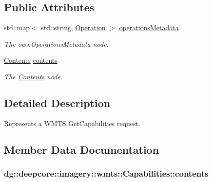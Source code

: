 \subsection*{Public Attributes}
\begin{DoxyCompactItemize}
\item 
std\+::map$<$ std\+::string, \hyperlink{structdg_1_1deepcore_1_1imagery_1_1wmts_1_1_operation}{Operation} $>$ \hyperlink{structdg_1_1deepcore_1_1imagery_1_1wmts_1_1_capabilities_a8f1483625c85a9ecebec0093ddfc6103}{operations\+Metadata}
\begin{DoxyCompactList}\small\item\em The ows\+:Operations\+Metadata node. \end{DoxyCompactList}\item 
\hyperlink{structdg_1_1deepcore_1_1imagery_1_1wmts_1_1_contents}{Contents} \hyperlink{structdg_1_1deepcore_1_1imagery_1_1wmts_1_1_capabilities_a0f74f0847b9299ec63d808edb74b1296}{contents}
\begin{DoxyCompactList}\small\item\em The \hyperlink{structdg_1_1deepcore_1_1imagery_1_1wmts_1_1_contents}{Contents} node. \end{DoxyCompactList}\end{DoxyCompactItemize}


\subsection{Detailed Description}
Represents a W\+M\+TS Get\+Capabilities request. 

\subsection{Member Data Documentation}
\subsubsection[{\texorpdfstring{contents}{contents}}]{ dg\+::deepcore\+::imagery\+::wmts\+::\+Capabilities\+::contents}\hypertarget{structdg_1_1deepcore_1_1imagery_1_1wmts_1_1_capabilities_a0f74f0847b9299ec63d808edb74b1296}{}\label{structdg_1_1deepcore_1_1imagery_1_1wmts_1_1_capabilities_a0f74f0847b9299ec63d808edb74b1296}


